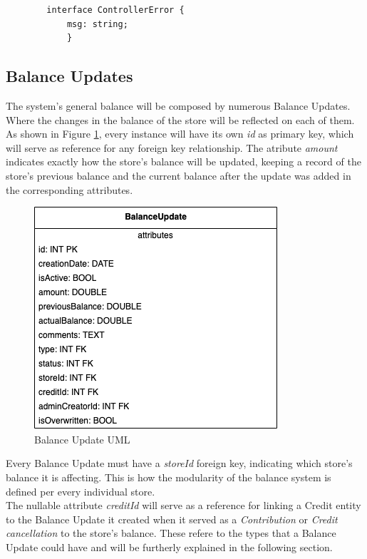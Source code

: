     \begin{verbatim}
        interface ControllerError {
            msg: string;
            }
    \end{verbatim}
                

    \subsection{Balance Updates}

The system's general balance will be composed by numerous Balance Updates. Where the changes in the balance of the store will be reflected on each of them. As shown in Figure \ref{fig:uml_balance_update}, every instance will have its own \textit{id} as primary key, which will serve as reference for any foreign key relationship. The atribute \textit{amount} indicates exactly how the store's balance will be updated, keeping a record of the store's previous balance and the current balance after the update was added in the corresponding attributes.

\begin{figure} [H]
    \centering
    \includegraphics[scale = 0.7]{assets/uml/BalanceUpdate.png}
    \caption{Balance Update UML}\label{fig:uml_balance_update}
\end{figure}

Every Balance Update must have a \textit{storeId} foreign key, indicating which store's balance it is affecting. This is how the modularity of the balance system is defined per every individual store.\\ 

The nullable attribute \textit{creditId} will serve as a reference for linking a Credit entity to the Balance Update it created when it served as a \textit{Contribution} or \textit{Credit cancellation} to the store's balance. These refere to the types that a Balance Update could have and will be furtherly explained in the following section.\\

